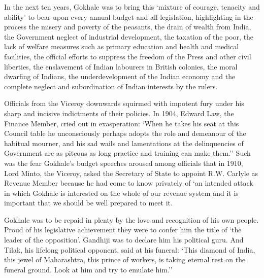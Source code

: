 In the next ten years, Gokhale was to bring this `mixture of courage, tenacity and ability' to bear upon every annual budget and all legislation, highlighting in the process the misery and poverty of the peasants, the drain of wealth from India, the Government neglect of industrial development, the taxation of the poor, the lack of welfare measures such as primary education and health and medical facilities, the official efforts to suppress the freedom of the Press and other civil liberties, the enslavement of Indian labourers in British colonies, the moral dwarfing of Indians, the underdevelopment of the Indian economy and the complete neglect and subordination of Indian interests by the rulers.

Officials from the Viceroy downwards squirmed with impotent fury under his sharp and incisive indictments of their policies. In 1904, Edward Law, the Finance Member, cried out in exasperation: `When he takes his seat at this Council table he unconsciously perhaps adopts the role and demeanour of the habitual mourner, and his sad wails and lamentations at the delinquencies of Government are as piteous as long practice and training can make them.'' Such was the fear Gokhale's budget speeches aroused among officials that in 1910, Lord Minto, the Viceroy, asked the Secretary of State to appoint R.W. Carlyle as Revenue Member because he had come to know privately of `an intended attack in which Gokhale is interested on the whole of our revenue system and it is important that we should be well prepared to meet it.

Gokhale was to be repaid in plenty by the love and recognition of his own people. Proud of his legislative achievement they were to confer him the title of `the leader of the opposition'. Gandhiji was to declare him his political guru. And Tilak, his lifelong political opponent, said at his funeral: `This diamond of India, this jewel of Maharashtra, this prince of workers, is taking eternal rest on the funeral ground. Look at him and try to emulate him.''
